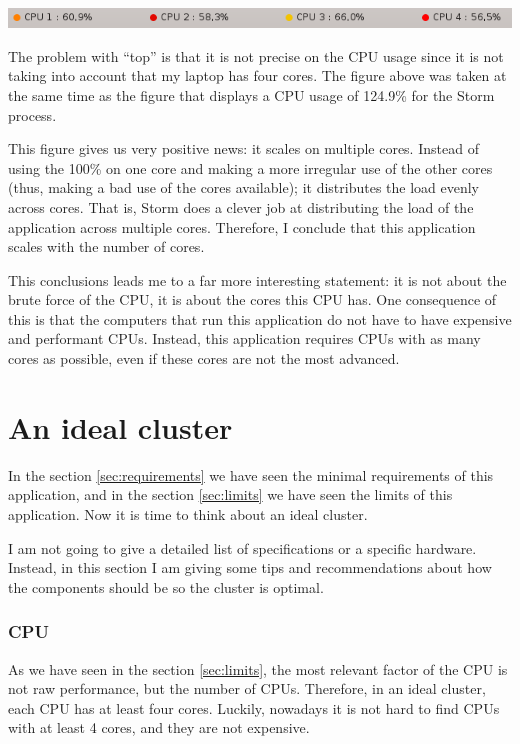 \begin{center}
  \includegraphics[scale=0.8]{hardware/images/cores.png}
\end{center}

The problem with ``top'' is that it is not precise on the CPU usage since it is
not taking into account that my laptop has four cores. The figure above was
taken at the same time as the figure that displays a CPU usage of 124.9\% for
the Storm process.

This figure gives us very positive news: it scales on multiple cores. Instead
of using the 100\% on one core and making a more irregular use of the other
cores (thus, making a bad use of the cores available); it distributes the load
evenly across cores. That is, Storm does a clever job at distributing the load
of the application across multiple cores. Therefore, I conclude that this
application scales with the number of cores.

This conclusions leads me to a far more interesting statement: it is not about
the brute force of the CPU, it is about the cores this CPU has. One consequence
of this is that the computers that run this application do not have to have
expensive and performant CPUs. Instead, this application requires CPUs with as
many cores as possible, even if these cores are not the most advanced.

\section{An ideal cluster}

In the section \ref{sec:requirements} we have seen the minimal requirements of
this application, and in the section \ref{sec:limits} we have seen the limits
of this application. Now it is time to think about an ideal cluster.

I am not going to give a detailed list of specifications or a specific
hardware. Instead, in this section I am giving some tips and recommendations
about how the components should be so the cluster is optimal.

\subsubsection*{CPU}

As we have seen in the section \ref{sec:limits}, the most relevant factor of
the CPU is not raw performance, but the number of CPUs. Therefore, in an ideal
cluster, each CPU has at least four cores. Luckily, nowadays it is not hard to
find CPUs with at least 4 cores, and they are not expensive.

